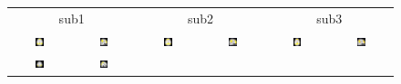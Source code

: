 \documentclass[runningheads,a4paper]{llncs}
\begin{document}
\begin{figure}[htb]
\centering
\begin{tabular}[b]{cc|cc|cc}
\multicolumn{2}{c}{sub1} &
\multicolumn{2}{c}{sub2} &
\multicolumn{2}{c}{sub3} \\
\includegraphics[width=0.15\textwidth]{figure3/dmn_a} &
\includegraphics[width=0.15\textwidth]{figure3/dmn_s} &
\includegraphics[width=0.15\textwidth]{figure3/dmn_sub17_a} &
\includegraphics[width=0.15\textwidth]{figure3/dmn_sub17_s} &
\includegraphics[width=0.15\textwidth]{figure3/dmn_sub21_a} &
\includegraphics[width=0.15\textwidth]{figure3/dmn_sub21_s} \\
\includegraphics[width=0.15\textwidth]{figure3/atten_a} &
\includegraphics[width=0.15\textwidth]{figure3/atten_s} &

\end{tabular}
\end{figure}
\end{document}
